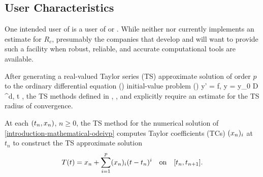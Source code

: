 \documentclass[12pt]{article}
\begin{document}


\subsection{User Characteristics} \label{SecUserCharacteristics}
\label{sc:SecUserCharacteristics}

One intended user of  is a user of \maple or \matlab. While
neither \matlab nor \maple currently implements an estimate for $R_c$,
presumably the companies that develop \matlab and \maple will want
to provide such a facility when robust, reliable, and accurate computational
tools are available.

After generating a real-valued Taylor series (TS) approximate solution of order $p$ to the
ordinary differential equation (\ode) initial-value problem (\ivp) 
\EQ
{
  \label{eq:introduction-mathematical-odeivp}
  y' = f,
  \quad
  y = y_0 \in \mathcal D \subset \Rz^d,
  \quad
  t \in \iode \subset \Rz,
}
the TS methods defined in
\cite{jorba2005software},
\cite{bergsma2016application},
and \cite{chang1982} explicitly require an estimate for the TS radius of convergence.

At each $( {t_n,x_n} )$, $n \geq 0$, the TS method for the numerical solution
of \eqref{introduction-mathematical-odeivp} computes Taylor coefficients (TCs)
$(x_{n})_{i}$ at $t_{n}$ to construct the TS approximate solution
\begin{align}
  \label{eq:tss}
  \Tp(t) = \xn + \sum_{i=1}^{p}\tc{\xn}{i}(t-\tn)^{i} \quad\mbox{on}\quad \lode.
\end{align}
\end{document}
